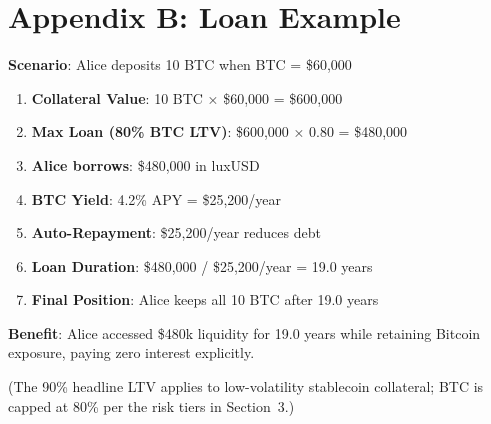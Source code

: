 \section{Appendix B: Loan Example}


\textbf{Scenario}: Alice deposits 10 BTC when BTC = \$60,000

\begin{enumerate}
\item \textbf{Collateral Value}: 10 BTC × \$60,000 = \$600,000
\item \textbf{Max Loan (80\% BTC LTV)}: \$600,000 × 0.80 = \$480,000
\item \textbf{Alice borrows}: \$480,000 in luxUSD
\item \textbf{BTC Yield}: 4.2\% APY = \$25,200/year
\item \textbf{Auto-Repayment}: \$25,200/year reduces debt
\item \textbf{Loan Duration}: \$480,000 / \$25,200/year = 19.0 years
\item \textbf{Final Position}: Alice keeps all 10 BTC after 19.0 years
\end{enumerate}

\textbf{Benefit}: Alice accessed \$480k liquidity for 19.0 years while retaining Bitcoin exposure, paying zero interest explicitly.

(The 90\% headline LTV applies to low-volatility stablecoin collateral; BTC is capped at 80\% per the risk tiers in Section~3.)

